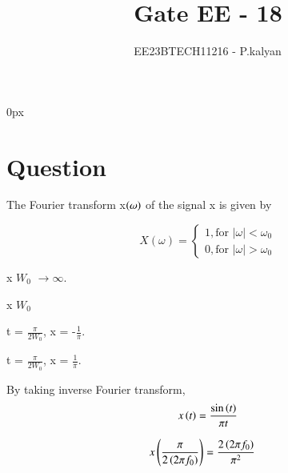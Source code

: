 \documentclass[journal,12pt,twocolumn]{IEEEtran}
\theoremstyle{remark}
\begin{document}
\parindent 0px


\title{Gate EE - 18}
\author{EE23BTECH11216 - P.kalyan$^{}$%
}
\maketitle
\newpage
\bigskip

\renewcommand{\thefigure}{\theenumi}
\renewcommand{\thetable}{\theenumi}
\section*{Question}
The Fourier transform x$\left(\omega\right)$ of  the signal x is given by

\[
X(\omega) = 
\begin{cases} 
1, \text{for } |\omega| < \omega_0 \\
0, \text{for } |\omega| > \omega_0 
\end{cases}
\]

 x  $W_0$ $\rightarrow \infty$.

 x  $W_0$ 

 t = $\frac{\pi}{2W_0}$, \quad x = -$\frac{1}{\pi}$.

 t = $\frac{\pi}{2W_0}$, \quad x = $\frac{1}{\pi}$. \hfill{}


 \fi

\begin{center}
\end{center}

By taking inverse Fourier transform,
\begin{align}
x\left(t\right) = \frac{\sin\left( t\right)}{\pi t}
\end{align}

\begin{align}
& x\left(\frac{\pi}{2\left(2\pi f_{0}\right)}\right) =\frac{2 \left(2\pi f_{0}\right)}{\pi^2}
\end{align}
\end{document}
